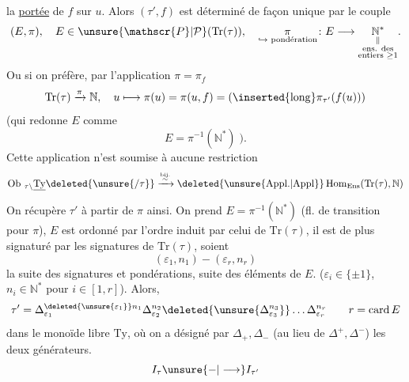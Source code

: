 la \uline{portée} de $f$ sur $u$. Alors  $(\tau',f)$ est déterminé
de façon unique par le couple
\[
 (E,\pi),\quad E\in\unsure{\mathscr{P}|\mathcal{P}}(\mathrm{Tr}(\tau)),\quad
 \underset{\text{\(\hookrightarrow\) pondération}}{\pi}\colon E\longrightarrow
 \underset{\substack{\parallel\\\text{ens. des}\\\text{entiers }\geq 1}}{\mathbb N^*}.
\]
Ou si on préfère, par l'application $\pi=\pi_f$
\[
 \mathrm{Tr}(\tau)\xrightarrow{\pi}\mathbb N,\quad
 u\longmapsto\pi(u)=\pi(u,f)=(\inserted{\operatorname{long}}\pi_{\tau'}(f(u)))
\]
(qui redonne $E$ comme
\[
 E=\pi^{-1}(\mathbb N^*)\;).
\]
Cette application n'est soumise à aucune restriction
\[
 \operatorname{Ob}\,{}_{\tau\backslash}\underline{\mathrm{Ty}}\deleted{\unsure{/\tau}}
 \xrightarrow[\ ]{\overset{\mathrm{bij.}}{\sim}}
 \deleted{\unsure{\mathrm{Appl.}|\mathrm{Appl}}}\operatorname{Hom}_{\mathrm{Ens}}(\mathrm{Tr}(\tau),\mathbb N)
\]
On récupère $\tau'$ à partir de $\pi$ ainsi. On
prend $E=\pi^{-1}(\mathbb N^*)$ (fl. de transition  
pour $\pi$), $E$ est  ordonné par l'ordre induit
par celui de $\mathrm{Tr}(\tau)$, il est de plus signaturé
par les signatures de $\mathrm{Tr}(\tau)$, soient
\[
 (\varepsilon_1,n_1)\mathbin{-}(\varepsilon_r,n_r)
\]
la suite des signatures et pondérations,  
suite des éléments de $E$. \quad ($\varepsilon_i\in\{\pm1\}$, $n_i\in\mathbb N^*$
pour $i\in[1,r]$). Alors,
\[
 \tau'=\Delta_{\varepsilon_1}^{\deleted{\unsure{\varepsilon_1}}n_1}\Delta_{\varepsilon_2}^{n_2}
 \deleted{\unsure{\Delta_{\varepsilon_3}^{n_3}}}\ldots\Delta_{\varepsilon_r}^{n_r}
 \qquad r=\operatorname{card}E
\]
dans le monoïde libre $\mathrm{Ty}$, où on a désigné
par $\Delta_+,\Delta_-$ (au lieu de $\Delta^+,\Delta^-$) les
deux générateurs. 
\[
 I_\tau\unsure{\mathbin{-}|\longrightarrow} I_{\tau'}
\]
